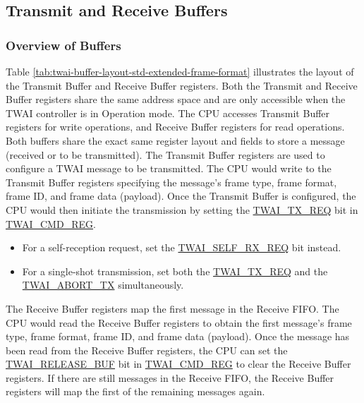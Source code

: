 \documentclass[main\_\_EN.tex]{subfiles}
\begin{document}
\subsection{Transmit and Receive Buffers}
\subsubsection{Overview of Buffers}



Table \ref{tab:twai-buffer-layout-std-extended-frame-format} illustrates the layout of the Transmit Buffer and Receive Buffer registers. Both the Transmit and Receive Buffer registers share the same address space and are only accessible when the TWAI controller is in Operation mode. The CPU accesses Transmit Buffer registers for write operations, and Receive Buffer registers for read operations. Both buffers share the exact same register layout and fields to store a message (received or to be transmitted).
The Transmit Buffer registers are used to configure a TWAI message to be transmitted. The CPU would write to the Transmit Buffer registers specifying the message's frame type, frame format, frame ID, and frame data (payload). Once the Transmit Buffer is configured, the CPU would then initiate the transmission by setting the \hyperref[fielddesc:TWAITXREQ]{TWAI\_TX\_REQ} bit in \hyperref[regdesc:TWAICMDREG]{TWAI\_CMD\_REG}.

\begin{itemize}
    \item For a self-reception request, set the \hyperref[fielddesc:TWAISELFRXREQ]{TWAI\_SELF\_RX\_REQ} bit instead.
    \item For a single-shot transmission, set both the \hyperref[fielddesc:TWAITXREQ]{TWAI\_TX\_REQ} and the \hyperref[fielddesc:TWAIABORTTX]{TWAI\_ABORT\_TX} simultaneously.
\end{itemize}

The Receive Buffer registers map the first message in the Receive FIFO. The CPU would read the Receive Buffer registers to obtain the first message's frame type, frame format, frame ID, and frame data (payload). Once the message has been read from the Receive Buffer registers, the CPU can set the \hyperref[fielddesc:TWAIRELEASEBUF]{TWAI\_RELEASE\_BUF} bit in \hyperref[regdesc:TWAICMDREG]{TWAI\_CMD\_REG} to clear the Receive Buffer registers. If there are still messages in the Receive FIFO, the Receive Buffer registers will map the first of the remaining messages again.
\end{document}
